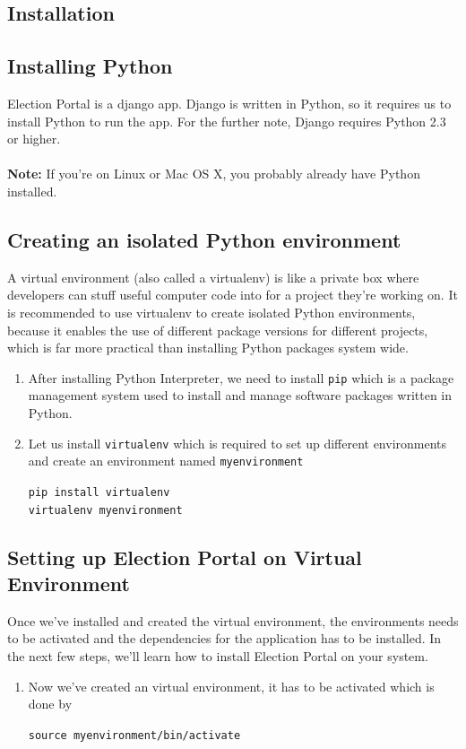 \documentclass[12pt, a4paper, titlepage]{article}
\begin{document}
\begin{appendices}
\section{Installation}
\subsection{Installing Python}

Election Portal is a django app. Django is written in Python, so it requires us to install Python to run the app. For the further note, Django requires Python 2.3 or higher. \\ \\
\textbf{Note:} If you’re on Linux or Mac OS X, you probably already have Python installed.

\subsection{Creating an isolated Python environment}
A virtual environment (also called a virtualenv) is like a private box where developers can stuff useful computer code into for a project they're working on. It is recommended to use virtualenv to create isolated Python environments, because it enables the use of different package versions for different projects, which is far more practical than installing Python packages system wide.
\begin{enumerate}
\item After installing Python Interpreter, we need to install \verb|pip| which is a package management system used to install and manage software packages written in Python.     

\item Let us install \verb|virtualenv| which is required to set up different environments and create an environment named \verb|myenvironment|
\begin{center}
\verb|pip install virtualenv|\\
\verb|virtualenv myenvironment|
\end{center}
\end{enumerate}

\subsection{Setting up Election Portal on Virtual Environment}
Once we've installed and created the virtual environment, the environments needs to be activated and the dependencies for the application has to be installed. In the next few steps, we'll learn how to install Election Portal on your system.
\begin{enumerate}
\item Now we've created an virtual environment, it has to be activated which is done by
\begin{center}
\verb|source myenvironment/bin/activate|
\end{center}


\end{enumerate}
\end{appendices}
\end{document}
